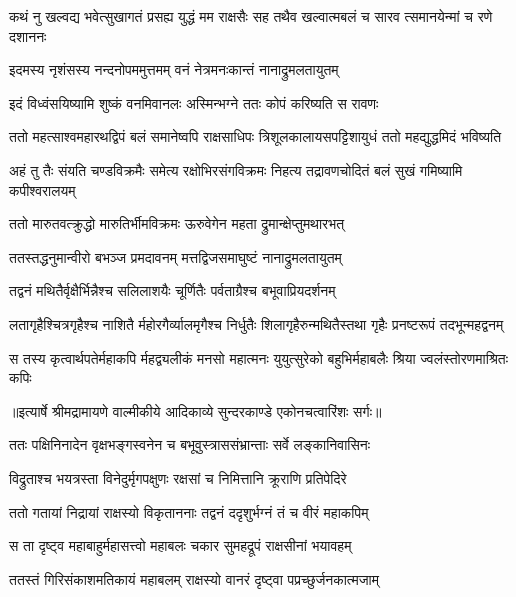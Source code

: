 \fourlineindentedshloka
{कथं नु खल्वद्य भवेत्सुखागतं}
{ प्रसह्य युद्धं मम राक्षसैः सह}
{तथैव खल्वात्मबलं च सारव}
{त्समानयेन्मां च रणे दशाननः} %

\twolineshloka
{इदमस्य नृशंसस्य नन्दनोपममुत्तमम्}
{वनं नेत्रमनःकान्तं नानाद्रुमलतायुतम्} %

\twolineshloka
{इदं विध्वंसयिष्यामि शुष्कं वनमिवानलः}
{अस्मिन्भग्ने ततः कोपं करिष्यति स रावणः} %

\fourlineindentedshloka
{ततो महत्साश्वमहारथद्विपं}
{ बलं समानेष्वपि राक्षसाधिपः}
{त्रिशूलकालायसपट्टिशायुधं}
{ ततो महद्युद्धमिदं भविष्यति} %

\fourlineindentedshloka
{अहं तु तैः संयति चण्डविक्रमैः}
{ समेत्य रक्षोभिरसंगविक्रमः}
{निहत्य तद्रावणचोदितं बलं}
{ सुखं गमिष्यामि कपीश्वरालयम्} %

\twolineshloka
{ततो मारुतवत्क्रुद्धो मारुतिर्भीमविक्रमः}
{ऊरुवेगेन महता द्रुमान्क्षेप्तुमथारभत्} %

\twolineshloka
{ततस्तद्धनुमान्वीरो बभञ्ज प्रमदावनम्}
{मत्तद्विजसमाघुष्टं नानाद्रुमलतायुतम्} %

\twolineshloka
{तद्वनं मथितैर्वृक्षैर्भिन्नैश्च सलिलाशयैः}
{चूर्णितैः पर्वताग्रैश्च बभूवाप्रियदर्शनम्} %

\fourlineindentedshloka
{लतागृहैश्चित्रगृहैश्च नाशितै}
{र्महोरगैर्व्यालमृगैश्च निर्धुतैः}
{शिलागृहैरुन्मथितैस्तथा गृहैः}
{ प्रनष्टरूपं तदभून्महद्वनम्} %

\fourlineindentedshloka
{स तस्य कृत्वार्थपतेर्महाकपि}
{र्महद्व्यलीकं मनसो महात्मनः}
{युयुत्सुरेको बहुभिर्महाबलैः}
{ श्रिया ज्वलंस्तोरणमाश्रितः कपिः} %


{॥इत्यार्षे श्रीमद्रामायणे वाल्मीकीये आदिकाव्ये सुन्दरकाण्डे एकोनचत्वारिंशः सर्गः॥}


\twolineshloka
{ततः पक्षिनिनादेन वृक्षभङ्गस्वनेन च}
{बभूवुस्त्राससंभ्रान्ताः सर्वे लङ्कानिवासिनः} %

\twolineshloka
{विद्रुताश्च भयत्रस्ता विनेदुर्मृगपक्षुणः}
{रक्षसां च निमित्तानि क्रूराणि प्रतिपेदिरे} %

\twolineshloka
{ततो गतायां निद्रायां राक्षस्यो विकृताननाः}
{तद्वनं ददृशुर्भग्नं तं च वीरं महाकपिम्} %

\twolineshloka
{स ता दृष्ट्व महाबाहुर्महासत्त्वो महाबलः}
{चकार सुमहद्रूपं राक्षसीनां भयावहम्} %

\twolineshloka
{ततस्तं गिरिसंकाशमतिकायं महाबलम्}
{राक्षस्यो वानरं दृष्ट्वा पप्रच्छुर्जनकात्मजाम्} %

